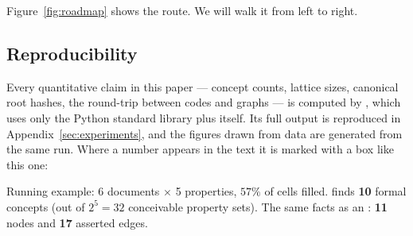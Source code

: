 Figure~\ref{fig:roadmap} shows the route. We will walk it from left to right.

\subsection{Reproducibility}

Every quantitative claim in this paper --- concept counts, lattice sizes,
canonical root hashes, the round-trip between codes and graphs --- is computed
by , which uses only the Python
standard library plus \odag{} itself. Its full output is reproduced in
Appendix~\ref{sec:experiments}, and the figures drawn from data are generated
from the same run. Where a number appears in the text it is marked with a
box like this one:

\begin{measured}
Running example: 6 documents $\times$ 5 properties, $57\%$ of cells filled.
\fca{} finds \textbf{10} formal concepts (out of $2^5=32$ conceivable
property sets). The same facts as an \odag{}: \textbf{11} nodes and
\textbf{17} asserted edges.
\end{measured}
